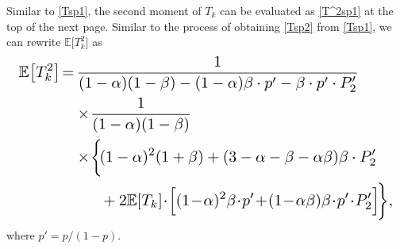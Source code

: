 \documentclass{IEEEtran}
\begin{document}
Similar to \eqref{Tsp1}, the second moment of $T_k$ can be evaluated as \eqref{T^2sp1} at the top of the next page. Similar to the process of obtaining \eqref{Tsp2} from \eqref{Tsp1}, we can rewrite $\mathbb{E}\big[T_{k}^2\big]$ as
	\begin{equation}\label{T^2sp2}
\resizebox{.98\hsize}{!}{$\begin{aligned}
	\mathbb{E}\big[T_{k}^2\big]\!= &\,\frac{1}{(1-\alpha)(1-\beta)-(1-\alpha)\beta\cdot p'-\beta\cdot p'\cdot P'_{2}}\\
	&\times\!\frac{1}{(1-\alpha)(1-\beta)}\\
	&\times\!\bigg\{\!(1-\alpha)^2(1+\beta)+(3-\alpha-\beta-\alpha\beta)\beta\cdot P'_{2}\\
	&\qquad\!\!+2\mathbb{E}[T_{k}]\!\cdot\!\Big[(1\!-\!\alpha)^2\beta\!\cdot \!p'\!+\!(1\!-\!\alpha\beta)\beta\!\cdot\! p'\!\cdot\! P'_{2} \Big]\!\bigg\},
	\end{aligned}$}
\end{equation}
where $p'=p/(1-p)$.




\end{document}
